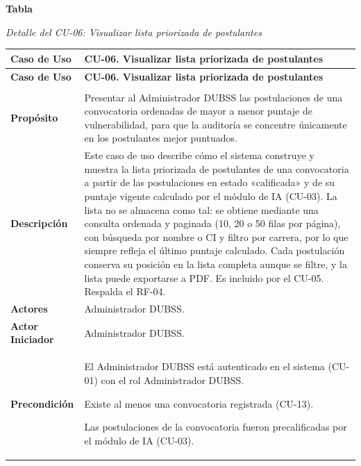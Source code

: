 \label{tab:detalle_cu06}
\noindent\textbf{Tabla~\thetable}\par\nopagebreak
\noindent\textit{Detalle del CU-06: Visualizar lista priorizada de postulantes}\par\nopagebreak
\begingroup\small\linespread{1}\selectfont
\begin{longtable}{>{\raggedright\arraybackslash}p{2.9cm} >{\raggedright\arraybackslash}p{12.6cm}}
\toprule
\textbf{Caso de Uso} & \textbf{CU-06. Visualizar lista priorizada de postulantes} \\
\midrule
\endfirsthead
\toprule
\textbf{Caso de Uso} & \textbf{CU-06. Visualizar lista priorizada de postulantes} \\
\midrule
\endhead
\endfoot
\bottomrule
\multicolumn{2}{l}{\textit{Nota.} Elaboración propia.} \\
\endlastfoot
\textbf{Propósito} & Presentar al Administrador DUBSS las postulaciones de una convocatoria ordenadas de mayor a menor puntaje de vulnerabilidad, para que la auditoría se concentre únicamente en los postulantes mejor puntuados. \\
\midrule
\textbf{Descripción} & Este caso de uso describe cómo el sistema construye y muestra la lista priorizada de postulantes de una convocatoria a partir de las postulaciones en estado «calificada» y de su puntaje vigente calculado por el módulo de IA (CU-03). La lista no se almacena como tal: se obtiene mediante una consulta ordenada y paginada (10, 20 o 50 filas por página), con búsqueda por nombre o CI y filtro por carrera, por lo que siempre refleja el último puntaje calculado. Cada postulación conserva su posición en la lista completa aunque se filtre, y la lista puede exportarse a PDF. Es incluido por el CU-05. Respalda el RF-04. \\
\midrule
\textbf{Actores} & Administrador DUBSS. \\
\midrule
\textbf{Actor Iniciador} & Administrador DUBSS. \\
\midrule
\textbf{Precondición} & \vspace{-\baselineskip}\begin{cuvin}
    \item El Administrador DUBSS está autenticado en el sistema (CU-01) con el rol Administrador DUBSS.
    \item Existe al menos una convocatoria registrada (CU-13).
    \item Las postulaciones de la convocatoria fueron precalificadas por el módulo de IA (CU-03).

\end{cuvin}
\end{longtable}
